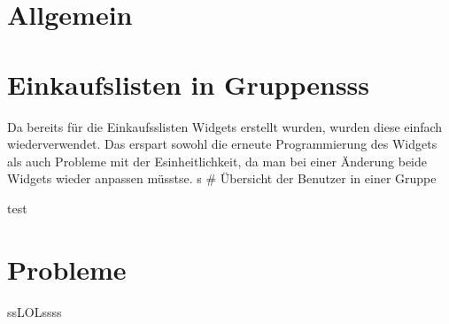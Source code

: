 \hypertarget{allgemein}{%
\section{Allgemein}\label{allgemein}}

\hypertarget{einkaufslisten-in-gruppensss}{%
\section{Einkaufslisten in
Gruppensss}\label{einkaufslisten-in-gruppensss}}

Da bereits für die Einkaufsslisten Widgets erstellt wurden, wurden diese
einfach wiederverwendet. Das erspart sowohl die erneute Programmierung
des Widgets als auch Probleme mit der Esinheitlichkeit, da man bei einer
Änderung beide Widgets wieder anpassen müsstse. s \# Übersicht der
Benutzer in einer Gruppe

test

\hypertarget{probleme}{%
\section{Probleme}\label{probleme}}

ssLOLssss
